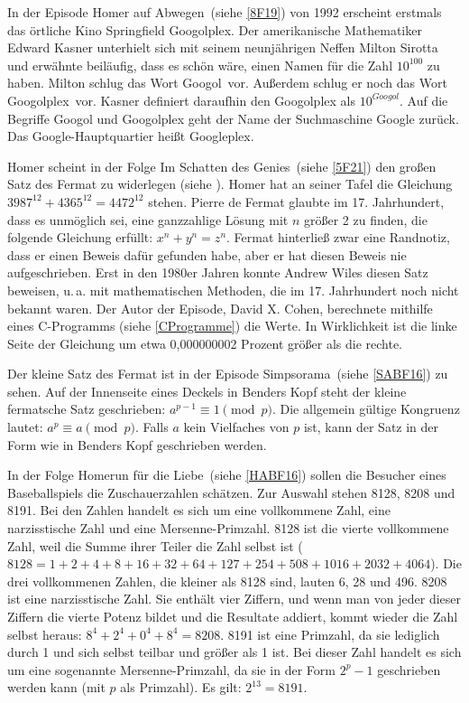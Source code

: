 \begin{appendix}
In der Episode \glqq Homer auf Abwegen\grqq\ (siehe \ref{8F19}) von 1992 erscheint erstmals das örtliche Kino \glqq Springfield Googolplex\grqq . Der amerikanische Mathematiker Edward Kasner unterhielt sich mit seinem neunjährigen Neffen Milton Sirotta und erwähnte beiläufig, dass es schön wäre, einen Namen für die Zahl $10^{100}$ zu haben. Milton schlug das Wort \glqq Googol\grqq\ vor. Außerdem schlug er noch das Wort \glqq Googolplex\grqq\ vor. Kasner definiert daraufhin den Googolplex als $10^{Googol}$. Auf die Begriffe Googol und Googolplex geht der Name der Suchmaschine Google zurück. Das Google-Hauptquartier heißt Googleplex.

Homer scheint in der Folge \glqq Im Schatten des Genies\grqq\ (siehe \ref{5F21}) den großen Satz des Fermat zu widerlegen (siehe \cite{Spektrum22}). Homer hat an seiner Tafel die Gleichung $3987^{12} + 4365^{12} = 4472^{12}$ stehen. Pierre de Fermat glaubte im 17. Jahrhundert, dass es unmöglich sei, eine ganzzahlige Lösung mit $n$ größer 2 zu finden, die folgende Gleichung erfüllt: $x^n + y^n = z^n$. Fermat hinterließ zwar eine Randnotiz, dass er einen Beweis dafür gefunden habe, aber er hat diesen Beweis nie aufgeschrieben. Erst in den 1980er Jahren konnte Andrew Wiles diesen Satz beweisen, u.\,a. mit mathematischen Methoden, die im 17. Jahrhundert noch nicht bekannt waren. Der Autor der Episode, David X. Cohen, berechnete mithilfe eines C-Programms (siehe \ref{CProgramme}) die Werte. In Wirklichkeit ist die linke Seite der Gleichung um etwa 0,000000002 Prozent größer als die rechte.

Der kleine Satz des Fermat ist in der Episode \glqq Simpsorama\grqq\ (siehe \ref{SABF16}) zu sehen. Auf der Innenseite eines Deckels in Benders Kopf steht der kleine fermatsche Satz geschrieben: $a^{p-1} \equiv 1\pmod p$. Die allgemein gültige Kongruenz lautet: $a^p \equiv a\pmod p$. Falls $a$ kein Vielfaches von $p$ ist, kann der Satz in der Form wie in Benders Kopf geschrieben werden.

In der Folge \glqq Homerun für die Liebe\grqq\ (siehe \ref{HABF16}) sollen die Besucher eines Baseballspiels die Zuschauerzahlen schätzen. Zur Auswahl stehen 8128, 8208 und 8191. Bei den Zahlen handelt es sich um eine vollkommene Zahl, eine narzisstische Zahl und eine Mersenne-Primzahl. 8128 ist die vierte vollkommene Zahl, weil die Summe ihrer Teiler die Zahl selbst ist ($8128 = 1 + 2 + 4 + 8 + 16 + 32 + 64 + 127 + 254 + 508 + 1016 + 2032 + 4064$). Die drei vollkommenen Zahlen, die kleiner als 8128 sind, lauten 6, 28 und 496.
8208 ist eine narzisstische Zahl. Sie enthält vier Ziffern, und wenn man von jeder dieser Ziffern die vierte Potenz bildet und die Resultate addiert, kommt wieder die Zahl selbst heraus: $8^4 + 2^4 + 0^4 + 8^4 = 8208$.
8191 ist eine Primzahl, da sie lediglich durch 1 und sich selbst teilbar und größer als 1 ist. Bei dieser Zahl handelt es sich um eine sogenannte Mersenne-Primzahl, da sie in der Form $2^p -1$ geschrieben werden kann (mit $p$ als Primzahl). Es gilt: $2^{13} = 8191$.


\end{appendix}
